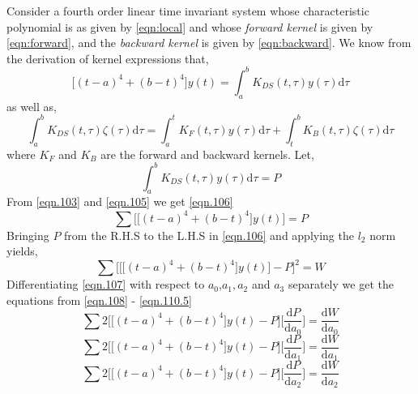 \documentclass[letterpaper%
, twoside%
, 12pt%
,memoire%
, english%
,creativecommons,hyperref%
]{thETS}
\begin{document}
Consider a fourth order linear time invariant system whose characteristic polynomial is as given by \eqref{eqn:local} and whose \textit{forward kernel} is given by \eqref{eqn:forward}, and the \textit{backward kernel} is given by \eqref{eqn:backward}. 
We know from the derivation of kernel expressions \citep{RN120} that, 
\begin{equation}\label{eqn.103}
\bigg[(t-a)^4+(b-t)^4\bigg]y(t) = \int_{a}^{b} K_{DS}(t,\tau)y(\tau)\mathrm{d}\tau
\end{equation}
as well as,
\begin{equation}\label{eqn.104}
\int_{a}^{b} K_{DS}(t,\tau)\zeta(\tau)\mathrm{d}\tau = \int_{a}^{t}K_{F}(t,\tau)y(\tau)\mathrm{d}\tau + \int_{t}^{b}K_{B}(t,\tau)\zeta(\tau)\mathrm{d}\tau 
\end{equation}
where $K_F$ and $K_B$ are the forward and backward kernels. Let,
\begin{equation}\label{eqn.105}
\int_{a}^{b} K_{DS}(t,\tau)y(\tau)\mathrm{d}\tau = P
\end{equation}
From \eqref{eqn.103} and \eqref{eqn.105} we get \eqref{eqn.106}
\begin{equation}\label{eqn.106}
\sum\bigg[\big[(t-a)^4 + (b-t)^4\big]y(t)\bigg] = P
\end{equation}
Bringing $P$ from the R.H.S to the L.H.S in \eqref{eqn.106} and applying the $l_2$ norm yields,
\begin{equation}\label{eqn.107}
\sum\bigg[\bigg[\big[(t-a)^4 + (b-t)^4\big]y(t)\bigg] - P\bigg]^2 = W 
\end{equation}
Differentiating \eqref{eqn.107} with respect to $a_{0}$,$a_{1},a_{2}$ and $a_{3}$ separately we get the equations from \eqref{eqn.108} - \eqref{eqn.110.5}
\begin{equation}\label{eqn.108}
\sum 2\bigg[\big[(t-a)^4 + (b-t)^4\big]y(t) - P\bigg] \bigg[\frac{\mathrm{d}P}{\mathrm{d}a_{0}}\bigg] = \frac{\mathrm{d}W}{\mathrm{d}a_{0}}  
\end{equation}
\begin{equation}\label{eqn.109}
\sum 2\bigg[\big[(t-a)^4 + (b-t)^4\big]y(t) - P\bigg] \bigg[\frac{\mathrm{d}P}{\mathrm{d}a_{1}}\bigg] = \frac{\mathrm{d}W}{\mathrm{d}a_{1}}  
\end{equation}
\begin{equation}\label{eqn.110}
\sum 2\bigg[\big[(t-a)^4 + (b-t)^4\big]y(t) - P\bigg] \bigg[\frac{\mathrm{d}P}{\mathrm{d}a_{2}}\bigg] = \frac{\mathrm{d}W}{\mathrm{d}a_{2}} 
\end{equation}
\end{document}
